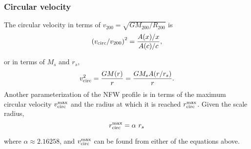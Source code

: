 \subsubsection{Circular velocity}\label{circular-velocity}

The circular velocity in terms of
\(v_{200} = \sqrt{G M_{200} / R_{200}}\) is \begin{equation}
\left(v_{\rm circ}/v_{200}\right)^2 = \frac{A(x)/x}{A(c)/c},
\end{equation}

or in terms of \(M_s\) and \(r_s\), \begin{equation}
v_{\rm circ}^2 = \frac{G M(r)}{r} = \frac{G M_s A(r/r_s)}{r}.
\end{equation} Another parameterization of the NFW profile is in terms
of the maximum circular velocity \(v_{\rm circ}^{\rm max}\) and the
radius at which it is reached \(r_{\rm circ}^{\rm max}\). Given the
scale radius, \begin{equation}
r_{\rm circ}^{\rm max} = \alpha\ r_s
\end{equation}

where \(\alpha\approx2.16258\), and \(v_{\rm circ}^{\rm max}\) can be
found from either of the equations above.
